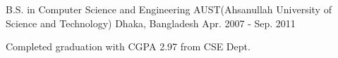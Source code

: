 

\begin{cventries}

  \cventry
    {B.S. in Computer Science and Engineering} %
    {AUST(Ahsanullah University of Science and Technology)} %
    {Dhaka, Bangladesh} %
    {Apr. 2007 - Sep. 2011} %
    {
      \begin{cvitems} %
        \item {Completed graduation with CGPA 2.97 from CSE Dept.}
      \end{cvitems}
    }

\end{cventries}
